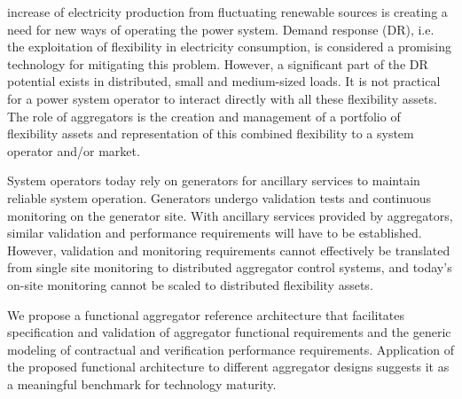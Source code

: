  increase of electricity production from fluctuating renewable sources is creating a need for new ways of operating the power system. Demand response (DR), i.e. the exploitation of flexibility in electricity consumption, is considered a promising technology for mitigating this problem. However, a significant part of the DR potential exists in distributed, small and medium-sized loads. It is not practical for a power system operator to interact directly with all these flexibility assets. The role of aggregators is the creation and management of a portfolio of flexibility assets and  representation of this combined flexibility to a system operator and/or market.

System operators today rely on generators for ancillary services to maintain reliable system operation. Generators undergo validation tests and continuous monitoring on the generator site. With ancillary services provided by aggregators, similar validation and performance requirements will have to be established. However, validation and monitoring requirements cannot effectively be translated from single site monitoring to distributed aggregator control systems, and today's on-site monitoring cannot be scaled to distributed flexibility assets. 

We propose a functional aggregator reference architecture that facilitates specification and validation of aggregator functional requirements and the generic modeling of contractual and verification performance requirements. Application of the proposed functional architecture to  different aggregator designs suggests it as a meaningful benchmark for technology maturity.


